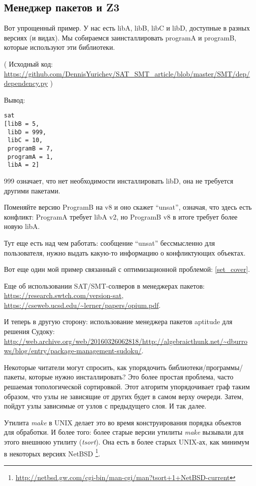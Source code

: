 \subsection{Менеджер пакетов и Z3}

Вот упрощенный пример.
У нас есть libA, libB, libC и libD, доступные в разных версиях (и видах).
Мы собираемся заинсталлировать programA и programB, которые используют эти библиотеки.



( Исходный код: \url{https://github.com/DennisYurichev/SAT_SMT_article/blob/master/SMT/dep/dependency.py} )

Вывод:

\begin{lstlisting}
sat
[libB = 5,
 libD = 999,
 libC = 10,
 programB = 7,
 programA = 1,
 libA = 2]
\end{lstlisting}

999 означает, что нет необходимости инсталлировать libD, она не требуется другими пакетами.

Поменяйте версию ProgramB на v8 и оно скажет ``unsat'', означая, что здесь есть конфликт:
ProgramA требует libA v2, но ProgramB v8 в итоге требует более новую libA.

Тут еще есть над чем работать: сообщение ``unsat'' бессмысленно для пользователя, нужно выдать какую-то информацию
о конфликтующих объектах.

Вот еще один мой пример связанный с оптимизационной проблемой: \ref{set_cover}.

Еще об использовании SAT/SMT-солверов в менеджерах пакетов: \url{https://research.swtch.com/version-sat},
\url{https://cseweb.ucsd.edu/~lerner/papers/opium.pdf}.

И теперь в другую сторону: использование менеджера пакетов aptitude для решения Судоку: \\
\url{http://web.archive.org/web/20160326062818/http://algebraicthunk.net/~dburrows/blog/entry/package-management-sudoku/}.

Некоторые читатели могут спросить, как упорядочить библиотеки/программы/пакеты, которые нужно инсталлировать?
Это более простая проблема, часто решаемая топологической сортировкой.
Этот алгоритм упорядочивает граф таким образом, что узлы не зависящие от других будет в самом верху очереди.
Затем, пойдут узлы зависимые от узлов с предыдущего слоя.
И так далее.

Утилита \textit{make} в UNIX делает это во время конструирования порядка объектов для обработки.
И более того: более старые версии утилиты \textit{make} вызывали для этого внешнюю утилиту (\textit{tsort}).
Она есть в более старых UNIX-ах, как минимум в некоторых версиях NetBSD
\footnote{\url{http://netbsd.gw.com/cgi-bin/man-cgi/man?tsort+1+NetBSD-current}}.

